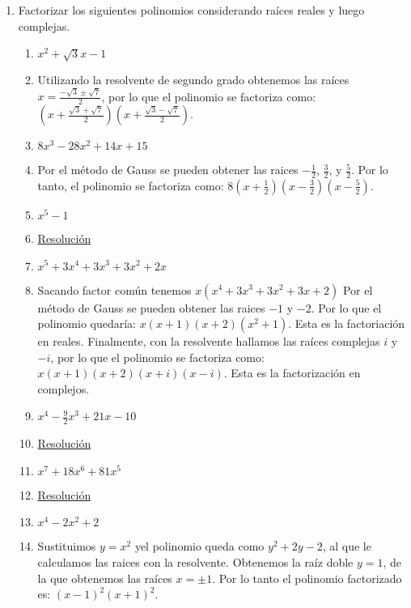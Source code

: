 \documentclass[a4paper]{article}
\newcommand{\answer}{\item[**]}
\newcommand{\exercise}{\item}
\newcommand{\df}[2]{\displaystyle\frac{#1}{#2}}
\begin{document}
\begin{enumerate}
\begin{enumerate} [label=(\alph*)]
		\item $3x^2+\gamma x+4$ tiene a 1 como raíz
		\answer $\gamma=-7$. \href{https://youtu.be/09D5Z3dcaXc}{Resolución}

		\item $x^3+\alpha x^2+\beta x+5$ es divisible por $Q(x)=x^2+x+1$
		\answer $\alpha=6$ y $\beta=6$. \href{https://youtu.be/jE5a43IQ91E}{Resolución}

	\end{enumerate}

	\exercise Factorizar los siguientes polinomios considerando raíces reales y luego complejas.

	\begin{multicols}{2}
	\begin{enumerate} [label=(\alph*)]
		
		\item $x^2+\sqrt{3}x-1$
		\answer Utilizando la resolvente de segundo grado obtenemos las raíces $x=\df{-\sqrt{3}\pm\sqrt{7}}{2}$, por lo que el polinomio se factoriza como: $\left(x+\df{\sqrt{3}+\sqrt{7}}{2}\right)\left(x+\df{\sqrt{3}-\sqrt{7}}{2}\right)$.

		\item $8x^3-28x^2+14x+15$
		\answer Por el método de Gauss se pueden obtener las raices $-\df{1}{2}$, $\df{3}{2}$, y $\df{5}{2}$. Por lo tanto, el polinomio se factoriza como: $8\left(x+\df{1}{2}\right)\left(x-\df{3}{2}\right)\left(x-\df{5}{2}\right)$.

		\item $x^5-1$
		\answer \href{https://youtu.be/ZMBXAdxOleM}{Resolución}

		\item $x^5+3x^4+3x^3+3x^2+2x$
		\answer Sacando factor común tenemos $x(x^4+3x^3+3x^2+3x+2)$ Por el método de Gauss se pueden obtener las raices $-1$ y $-2$. Por lo que el polinomio quedaría: $x(x+1)(x+2)(x^2+1)$. Esta es la factoriación en reales. Finalmente, con la resolvente hallamos las raíces complejas $i$ y $-i$, por lo que el polinomio se factoriza como: $x(x+1)(x+2)(x+i)(x-i)$. Esta es la factorización en complejos.
		
		\item $x^4-\df{9}{2}x^3+21x-10$
		\answer \href{https://youtu.be/1V06bnuaadA}{Resolución}

		\item $x^7+18x^6+81x^5$
		\answer \href{https://youtu.be/Z1KatpJM2eU}{Resolución}

		\item $x^4-2x^2+2$
		\answer Sustituimos $y=x^2$ yel polinomio queda como $y^2+2y-2$, al que le calculamos las raices con la resolvente. Obtenemos la raíz doble $y=1$, de la que obtenemos las raíces $x=\pm1$. Por lo tanto el polinomio factorizado es: $(x-1)^2(x+1)^2$. 


\end{enumerate}
\end{multicols}
\end{enumerate}
\end{document}
